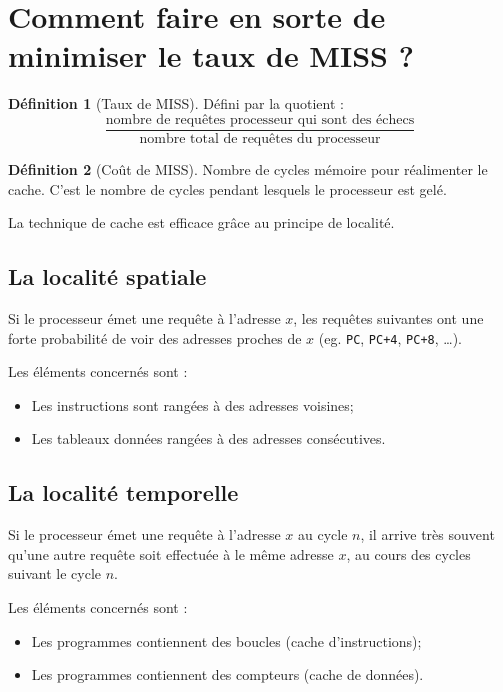 \documentclass[11pt,english,french]{scrreprt}
\theoremstyle{remark}
\theoremstyle{definition}
\newtheorem*{def*}{Définition}
\begin{document}
\section{Comment faire en sorte de minimiser le taux de MISS ?} %

\begin{def*}[Taux de MISS]
	Défini par la quotient :
	\[
		\frac{\textrm{nombre de requêtes processeur qui sont des échecs}}{\textrm{nombre total de requêtes du processeur}}
	\]
\end{def*}

\begin{def*}[Coût de MISS]
	Nombre de cycles mémoire pour réalimenter le cache. C'est le nombre de cycles pendant lesquels le processeur est gelé.
\end{def*}

La technique de cache est efficace grâce au principe de localité.

\subsection*{La localité spatiale} %

Si le processeur émet une requête à l'adresse $x$, les requêtes suivantes ont une forte probabilité de voir des adresses proches de $x$ (eg. \lstinline!PC!, \lstinline!PC+4!, \lstinline!PC+8!, \dots).

Les éléments concernés sont :\begin{itemize}
	\item Les instructions sont rangées à des adresses voisines;
	\item Les tableaux données rangées à des adresses consécutives.
\end{itemize}

\subsection*{La localité temporelle} %

Si le processeur émet une requête à l'adresse $x$ au cycle $n$, il arrive très souvent qu'une autre requête soit effectuée à le même adresse $x$, au cours des cycles suivant le cycle $n$.

Les éléments concernés sont :\begin{itemize}
	\item Les programmes contiennent des boucles (cache d'instructions);
	\item Les programmes contiennent des compteurs (cache de données).
\end{itemize}
\end{document}

